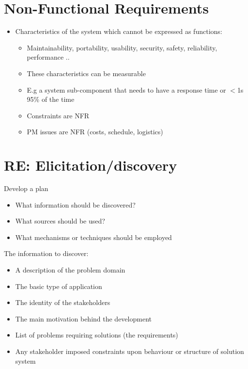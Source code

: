 \documentclass{article}[18pt]
\begin{document}
\section{Non-Functional Requirements}
\begin{itemize}
	\item Characteristics of the system which cannot be expressed as functions:
	\begin{itemize}
		\item Maintainability, portability, usability, security, safety, reliability, performance ..
		\item These characteristics can be measurable
		\item E.g a system sub-component that needs to have a response time or $<$1s 95\% of the time
		\item Constraints are NFR
		\item PM issues are NFR (costs, schedule, logistics)
	\end{itemize}
\end{itemize}
\section{RE: Elicitation/discovery}
Develop a plan
\begin{itemize}
	\item What information should be discovered?
	\item What sources should be used?
	\item What mechanisms or techniques should be employed
\end{itemize}
The information to discover:
\begin{itemize}
	\item A description of the problem domain
	\item The basic type of application
	\item The identity of the stakeholders
	\item The main motivation behind the development
	\item List of problems requiring solutions (the requirements)
	\item Any stakeholder imposed constraints upon behaviour or structure of solution system
\end{itemize}
\end{document}
